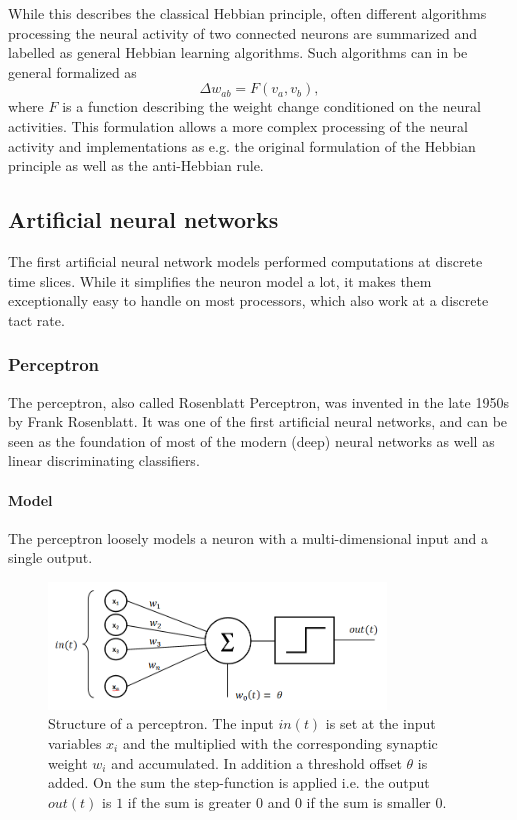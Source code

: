 While this describes the classical Hebbian principle, often different algorithms processing the neural activity of two connected neurons are summarized and labelled as general Hebbian learning algorithms.
Such algorithms can in be general formalized as
\[
\Delta w_{ab} = F( v_a, v_b) , 
\]
where $F$ is a function describing the weight change conditioned on the neural activities.     
This formulation allows a more complex processing of the neural activity and implementations as e.g. the original formulation of the Hebbian principle as well as the anti-Hebbian rule. 

\subsection{Artificial neural networks}

The first artificial neural network models performed computations at discrete time slices.
While it simplifies the neuron model a lot, it makes them exceptionally easy to handle on most processors, which also work at a discrete tact rate.

\subsubsection{Perceptron}

The perceptron, also called Rosenblatt Perceptron, was invented in the late 1950s by Frank Rosenblatt. 
It was one of the first artificial neural networks, and can be seen as the foundation of most of the modern (deep) neural networks as well as linear discriminating classifiers. 

\paragraph{Model}

The perceptron loosely models a neuron with a multi-dimensional input and a single output. 

\begin{figure}
	\centering
    	\includegraphics[width=0.8\textwidth]{imgs/percept.png} 
    \caption{Structure of a perceptron. The input $in(t)$ is set at the input variables $x_i$ and the multiplied with the corresponding synaptic weight $w_i$ and accumulated. In addition a threshold offset $\theta$ is added. On the sum the step-function is applied i.e. the output $out(t)$ is $1$ if the sum is greater $0$ and $0$ if the sum is smaller $0$.}
	\label{fig:perceptron}
\end{figure}

